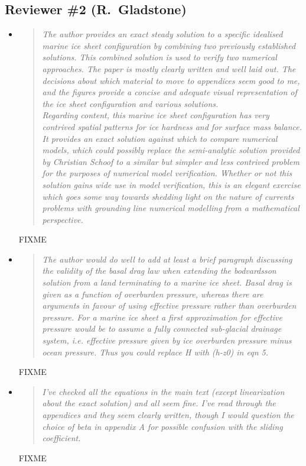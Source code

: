 \documentclass[11pt,reqno]{amsart}
\newcommand{\reply}[2]{
\medskip\medskip
\item  \begin{quote}
\emph{#1}
\end{quote}

\smallskip
\noindent #2}
\begin{document}
\subsection*{Reviewer \#2 (R.~Gladstone)}  \begin{itemize}
\reply{The author provides an exact steady solution to a specific idealised marine ice sheet configuration by combining two previously established solutions. This combined solution is used to verify two numerical approaches. The paper is mostly clearly written and well laid out. The decisions about which material to move to appendices seem good to me, and the figures provide a concise and adequate visual representation of the ice sheet configuration and various solutions.  \smallskip \\
Regarding content, this marine ice sheet configuration has very contrived spatial patterns for ice hardness and for surface mass balance.  It provides an exact solution against which to compare numerical models, which could possibly replace the semi-analytic solution provided by Christian Schoof to a similar but simpler and less contrived problem for the purposes of numerical model verification. Whether or not this solution gains wide use in model verification, this is an elegant exercise which goes some way towards shedding light on the nature of currents problems with grounding line numerical modelling from a mathematical perspective.}{FIXME}

\reply{The author would do well to add at least a brief paragraph discussing the validity of the basal drag law when extending the bodvardsson solution from a land terminating to a marine ice sheet. Basal drag is given as a function of overburden pressure, whereas there are arguments in favour of using effective pressure rather than overburden pressure. For a marine ice sheet a first approximation for effective pressure would be to assume a fully connected sub-glacial drainage system, i.e. effective pressure given by ice overburden pressure minus ocean pressure. Thus you could replace H with (h-z0) in eqn 5.}{FIXME}

\reply{I've checked all the equations in the main text (except linearization about the exact solution) and all seem fine. I've read through the appendices and they seem clearly written, though I would question the choice of beta in appendix A for possible confusion with the sliding coefficient.}{FIXME}


\end{itemize}
\end{document}

